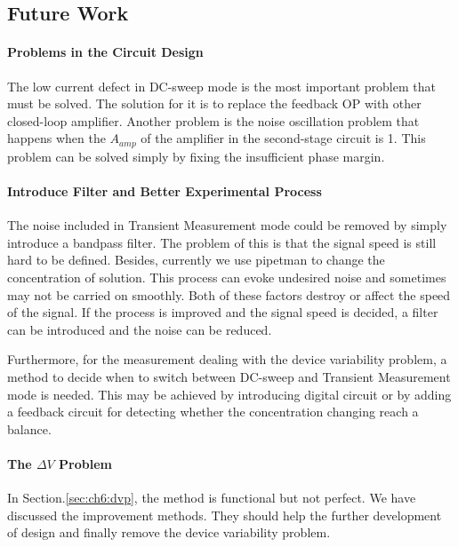 \subsection{Future Work}
\paragraph{Problems in the Circuit Design}
The low current defect in DC-sweep mode is the most important problem that must be solved.
The solution for it is to replace the feedback OP with other closed-loop amplifier.
Another problem is the noise oscillation problem that happens when the $A_{amp}$ of the amplifier in the second-stage circuit is 1.
This problem can be solved simply by fixing the insufficient phase margin.

\paragraph{Introduce Filter and Better Experimental Process}
The noise included in Transient Measurement mode could be removed by simply introduce a bandpass filter.
The problem of this is that the signal speed is still hard to be defined.
Besides, currently we use pipetman to change the concentration of solution.
This process can evoke undesired noise and sometimes may not be carried on smoothly.
Both of these factors destroy or affect the speed of the signal.
If the process is improved and the signal speed is decided, a filter can be introduced and the noise can be reduced.

Furthermore, for the measurement dealing with the device variability problem, a method to decide when to switch between DC-sweep and Transient Measurement mode is needed.
This may be achieved by introducing digital circuit or by adding a feedback circuit for detecting whether the concentration changing reach a balance.

\paragraph{The $\Delta V$ Problem}
In Section.\ref{sec:ch6:dvp}, the method is functional but not perfect.
We have discussed the improvement methods.
They should help the further development of design and finally remove the device variability problem.













%
